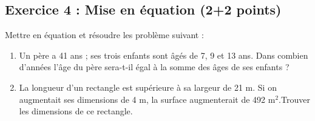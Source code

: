 \documentclass[14 pt, fleqn, pstricks]{extarticle}
\theoremstyle{plain}
\begin{document}
     \subsection*{Exercice 4 : Mise en équation (2+2 points)}

Mettre en équation et résoudre les problème suivant : 
\begin{enumerate}
\item  Un père a 41 ans ; ses trois enfants sont âgés de 7, 9 et 13 ans. Dans combien d'années l'âge du
père sera-t-il égal à la somme des âges de ses enfants ?
\item La longueur d'un rectangle est supérieure à sa largeur de 21 m. Si on augmentait ses dimensions
de 4 m, la surface augmenterait de 492 m${}^2$.Trouver les dimensions de ce rectangle.
\end{enumerate}



 	
\end{document}
